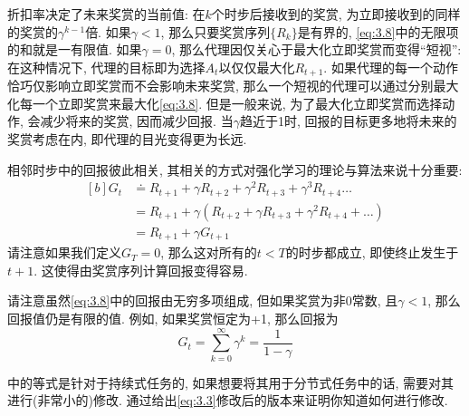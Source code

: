 折扣率决定了未来奖赏的当前值: 在$k$个时步后接收到的奖赏, 为立即接收到的同样的奖赏的$\gamma^{k - 1}$倍. 如果$\gamma < 1$, 那么只要奖赏序列$\{ R_k \}$是有界的, \eqref{eq:3.8}中的无限项的和就是一有限值. 如果$\gamma = 0$, 那么代理因仅关心于最大化立即奖赏而变得``短视'': 在这种情况下, 代理的目标即为选择$A_t$以仅仅最大化$R_{t + 1}$. 如果代理的每一个动作恰巧仅影响立即奖赏而不会影响未来奖赏, 那么一个短视的代理可以通过分别最大化每一个立即奖赏来最大化\eqref{eq:3.8}. 但是一般来说, 为了最大化立即奖赏而选择动作, 会减少将来的奖赏, 因而减少回报. 当$\gamma$趋近于1时, 回报的目标更多地将未来的奖赏考虑在内, 即代理的目光变得更为长远.

相邻时步中的回报彼此相关, 其相关的方式对强化学习的理论与算法来说十分重要:
\begin{equation}\label{eq:3.9}
\begin{aligned}[b]
G_t &\doteq R_{t + 1} + \gamma R_{t + 2} + \gamma^2 R_{t + 3} + \gamma^3 R_{t + 4} \dots \\
&= R_{t + 1} + \gamma (R_{t + 2} + \gamma R_{t + 3} + \gamma^2 R_{t + 4} + \dots) \\
&= R_{t + 1} + \gamma G_{t + 1}
\end{aligned}
\end{equation}
请注意如果我们定义$G_T = 0$, 那么这对所有的$t < T$的时步都成立, 即使终止发生于$t + 1$. 这使得由奖赏序列计算回报变得容易.

请注意虽然\eqref{eq:3.8}中的回报由无穷多项组成, 但如果奖赏为非0常数, 且$\gamma < 1$, 那么回报值仍是有限的值. 例如, 如果奖赏恒定为+1, 那么回报为
\begin{equation}\label{eq:3.10}
G_t = \sum_{k = 0}^{\infty} \gamma^k = \frac{1}{1 - \gamma}
\end{equation}

\begin{exer}
中的等式是针对于持续式任务的, 如果想要将其用于分节式任务中的话, 需要对其进行(非常小的)修改. 通过给出\eqref{eq:3.3}修改后的版本来证明你知道如何进行修改. 
\end{exer}

